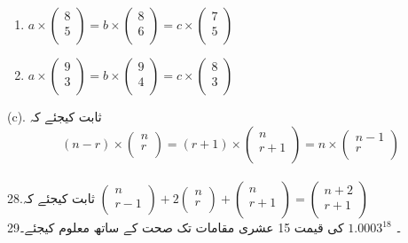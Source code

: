  \begin{enumerate}
 \item
\( a\times\begin{pmatrix}
8\\
5\\
\end{pmatrix}
=
b\times \begin{pmatrix}
8\\
6\\
\end{pmatrix}
=
c\times \begin{pmatrix}
7\\
5\\
\end{pmatrix}\)\\
\item
\( a\times \begin{pmatrix}
9\\
3\\
\end{pmatrix}
=
b\times\begin{pmatrix}
9\\
4\\
\end{pmatrix}
=
c\times \begin{pmatrix}
8\\
3\\
\end{pmatrix}\)\\
\end{enumerate}
(c).
 ثابت کیجئے کہ
 \[
 (n-r)\times
\begin{pmatrix}
n\\
r\\
\end{pmatrix}
=
(r+1)\times
\begin{pmatrix}
n\\
r+1\\
\end{pmatrix}
=
n\times
\begin{pmatrix}
n-1\\
r\\
\end{pmatrix}
\]\\
 28.ثابت کیجئے کہ
\(\begin{pmatrix}
n\\
r-1\\
\end{pmatrix}
+
2\begin{pmatrix}
n\\
r\\
\end{pmatrix}
+
\begin{pmatrix}
n\\
r+1\\
\end{pmatrix}
=
\begin{pmatrix}
n+2\\
r+1\\
\end{pmatrix}\)\\
29۔
\( {1.0003}^{18}\)
کی قیمت 15 عشری مقامات تک صحت کے ساتھ معلوم کیجئے۔ 


